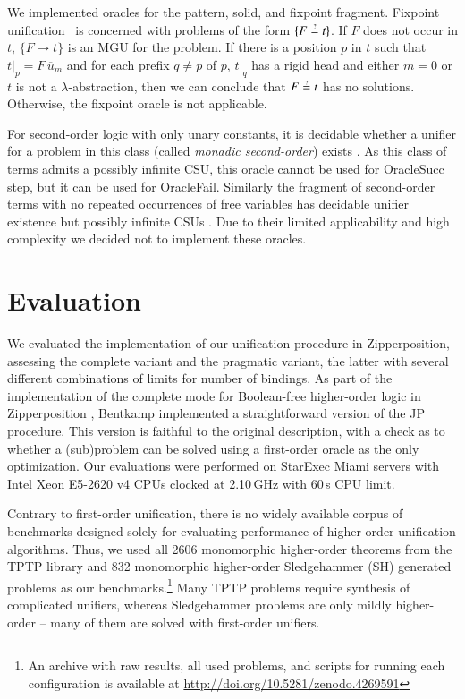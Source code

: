 We implemented oracles for the pattern, solid, and fixpoint fragment. 
Fixpoint unification~\cite{gh-75-unification} is concerned with problems of the form
$\{F \unif t\}$. If $F$ does not occur in $t$, $\{ F \mapsto t \}$
is an MGU for the problem. If there is a position $p$ in $t$ such that 
$t|_p = F \, \overline{u}_m$
and for each prefix $q\neq p$ of $p$, $t|_q$ has a rigid head and either $m=0$ or $t$ is not a $\lambda$-abstraction,
then we can conclude that $F \unif t$ has no solutions. Otherwise,
the fixpoint oracle is not applicable.

For second-order logic with only unary constants, it is decidable whether
a unifier for a problem in this class (called
\emph{monadic second-order}) exists \cite{wf-88-monadicunif}. As this class of terms admits a
possibly infinite CSU, this oracle cannot be used for \textsf{OracleSucc} step,
but it can be used for \textsf{OracleFail}. Similarly the fragment of
second-order terms with no repeated occurrences of free variables has decidable
unifier existence but possibly infinite CSUs
\cite{gd-01-unif-chapter}. Due to their limited applicability and high complexity we
decided not to implement these oracles.



\section{Evaluation}
\label{sec:unif:evaluation}We evaluated the implementation of our unification procedure in Zipperposition,
assessing the complete variant and the pragmatic variant, the latter with several
different combinations of limits for number of bindings. As part of the
implementation of the complete mode for Boolean-free higher-order logic in
Zipperposition \cite{bbtvw-21-sup-lam}, Bentkamp implemented a straightforward
version of the JP procedure. This version is faithful to the original description,
with a check as to whether a (sub)problem can be solved using a first-order oracle
as the only optimization. Our evaluations were performed on StarExec Miami
\cite{sst-14-starexec} servers with Intel Xeon E5-{2620 v4} CPUs clocked at {2.10}\,GHz with 60\,s CPU limit.

Contrary to first-order unification, there is no widely available corpus of
benchmarks designed solely for evaluating performance of higher-order
unification algorithms. Thus, we used all 2606 monomorphic higher-order theorems
from the TPTP library \cite{gs-17-tptp} and 832 monomorphic higher-order
Sledgehammer (SH) generated problems \cite{ns-13-leo2sh} as our benchmarks.\footnote{An archive with raw
results, all used problems, and scripts for running each configuration is
available at \url{http://doi.org/10.5281/zenodo.4269591}}
Many TPTP problems require synthesis of complicated unifiers,
whereas Sledgehammer problems are only mildly higher-order -- many of them are
solved with first-order unifiers.

